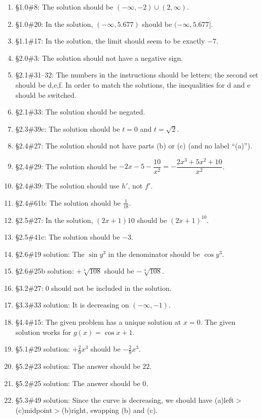 \documentclass{amsart}
\begin{document}
\begin{enumerate}
%
\item \S1.0\#8: The solution should be $(-\infty,-2)\cup(2,\infty)$.
\item \S1.0\#20: In the solution, $(-\infty,5.677)$ should be $(-\infty,5.677]$.
\item \S1.1\#17: In the solution, the limit should seem to be exactly $-7$.
\item \S2.0\#3: The solution should not have a negative sign.
\item \S2.1\#31--32: The numbers in the instructions should be letters; the second set should be d,e,f.  In order to match the solutions, the inequalities for d and e should be switched.
\item \S2.1\#33: The solution should be negated.
\item \S2.3\#39c: The solution should be $t=0$ and $t=\sqrt2$.
\item \S2.4\#27: The solution should not have parts (b) or (c) (and no label ``(a)'').
\item \S2.4\#29: The solution should be $-2x-5-\dfrac{10}{x^2}=-\dfrac{2x^3+5x^2+10}{x^2}$.
\item \S2.4\#39: The solution should use $h'$, not $f'$.
\item \S2.4\#61b: The solution should be $\frac1{18}$.
\item \S2.5\#27: In the solution, $(2x+1)10$ should be $(2x+1)^{10}$.
\item \S2.5\#41c: The solution should be $-3$.
\item \S2.6\#19 solution: The $\sin y^3$ in the denominator should be $\cos y^3$.
\item \S2.6\#25b solution: $+\sqrt[4]{108}$ should be $-\sqrt[4]{108}$.
\item \S3.2\#27: 0 should not be included in the solution.
\item \S3.3\#33 solution: It is decreasing on $(-\infty,-1)$.
\item \S4.4\#15: The given problem has a unique solution at $x=0$.  The given solution works for $g(x)=\cos x+1$.
\item \S5.1\#29 solution: $+\frac29 x^3$ should be $-\frac29 x^3$.
\item \S5.2\#23 solution: The answer should be $22$.
\item \S5.2\#25 solution: The answer should be $0$.
\item \S5.3\#49 solution: Since the curve is decreasing, we should have (a)left$>$(c)midpoint$>$(b)right, swapping (b) and (c).

\end{enumerate}
\end{document}
